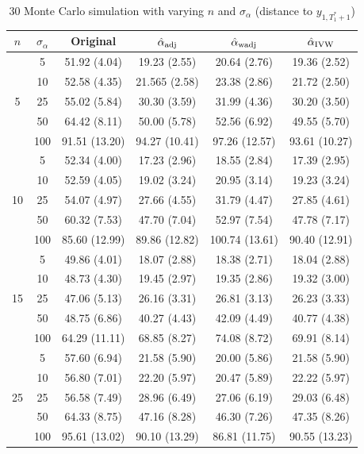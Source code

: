 \documentclass[11pt]{article}
\theoremstyle{definition}
\begin{document}
\begin{table}[t]
 \caption{30 Monte Carlo simulation with varying $n$ and $\sigma_{\alpha}$ (distance to $y_{1, T_1^*+1}$)} \label{table3}
 \begin{center}
\begin{tabular}{cc|cccc}
  $n$   & $\sigma_{\alpha}$  & Original & $\hat{\alpha}_{\rm adj}$ & $\hat{\alpha}_{\rm wadj}$ & $\hat{\alpha}_{\rm IVW}$\\[.3cm]  
  \hline
  \multirow{5}{*}{5} & 5  & 51.92 (4.04) & 19.23 (2.55) & 20.64 (2.76) & 19.36 (2.52) \\ 
  & 10  &  52.58 (4.35) & 21.565 (2.58) & 23.38 (2.86) & 21.72 (2.50) \\ 
  & 25  &  55.02 (5.84) & 30.30 (3.59) & 31.99 (4.36) & 30.20 (3.50) \\ 
  & 50  & 64.42 (8.11) & 50.00 (5.78) & 52.56 (6.92) & 49.55 (5.70) \\ 
  & 100  & 91.51 (13.20) & 94.27 (10.41) & 97.26 (12.57) & 93.61 (10.27) \\[.3cm]  
  \multirow{5}{*}{10} & 5 & 52.34 (4.00) & 17.23 (2.96) & 18.55 (2.84) & 17.39 (2.95) \\ 
  & 10 &  52.59 (4.05) & 19.02 (3.24) & 20.95 (3.14) & 19.23 (3.24) \\ 
  & 25 & 54.07 (4.97) & 27.66 (4.55) & 31.79 (4.47) & 27.85 (4.61) \\ 
  & 50 &  60.32 (7.53) & 47.70 (7.04) & 52.97 (7.54) & 47.78 (7.17) \\ 
  & 100 & 85.60 (12.99) & 89.86 (12.82) & 100.74 (13.61) & 90.40 (12.91) \\[.3cm]  
  \multirow{5}{*}{15} & 5 & 49.86 (4.01) & 18.07 (2.88) & 18.38 (2.71) & 18.04 (2.88) \\ 
  & 10 & 48.73 (4.30) & 19.45 (2.97) & 19.35 (2.86) & 19.32 (3.00) \\ 
  & 25 &  47.06 (5.13) & 26.16 (3.31) & 26.81 (3.13) & 26.23 (3.33) \\ 
  & 50 &  48.75 (6.86) & 40.27 (4.43) & 42.09 (4.49) & 40.77 (4.38) \\ 
  & 100 &  64.29 (11.11) & 68.85 (8.27) & 74.08 (8.72) & 69.91 (8.14) \\[.3cm]  
  \multirow{5}{*}{25} & 5 & 57.60 (6.94) & 21.58 (5.90) & 20.00 (5.86) & 21.58 (5.90) \\ 
  & 10 &  56.80 (7.01) & 22.20 (5.97) & 20.47 (5.89) & 22.22 (5.97) \\ 
  & 25 &  56.58 (7.49) & 28.96 (6.49) & 27.06 (6.19) & 29.03 (6.48) \\ 
  & 50 &  64.33 (8.75) & 47.16 (8.28) & 46.30 (7.26) & 47.35 (8.26) \\ 
  & 100 & 95.61 (13.02) & 90.10 (13.29) & 86.81 (11.75) & 90.55 (13.23) \\ 
\end{tabular}	
 \end{center}
 \vspace{-.5cm}
\end{table}
\end{document}
